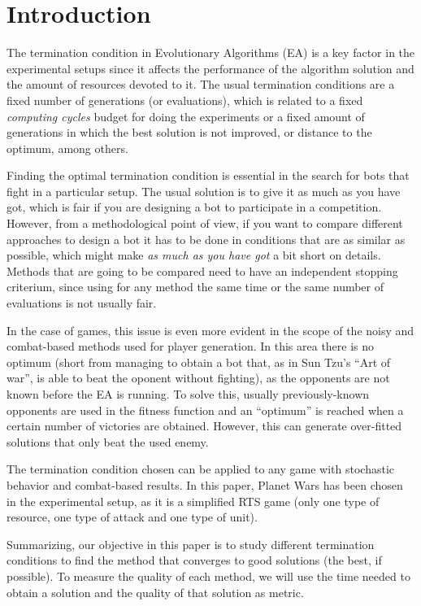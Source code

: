 \documentclass[runningheads,a4paper]{llncs}
\begin{document}
\section{Introduction}

The termination condition in Evolutionary Algorithms (EA) is a key
factor in the experimental setups since it affects the performance of
the algorithm solution and the amount of resources devoted to it. The
usual termination conditions are a fixed number of generations (or
evaluations), which is related to a fixed {\em computing cycles}
budget for doing the experiments or a fixed amount of generations in
which the best solution is not improved, or distance to the optimum,
among others.

Finding the optimal termination condition is essential in the search for
bots that fight in a particular setup. The usual solution is to give
it as much as you have got, which is fair if you are designing a bot %
to participate in a competition. However, from a methodological point
of view, if you want to compare different approaches to design a bot
it has to be done in conditions that are as similar as possible, which
might make {\em as much as you have got} a bit short on
details. Methods that are going to be compared need to have an
independent stopping criterium, since using for any method the same
time or the same number of evaluations is not usually fair. 
 
In the case of games, this issue is even more evident in the scope of
the noisy and combat-based methods used for player generation. In this
area there is no optimum (short from managing to obtain a bot that, as
in Sun Tzu's ``Art of war'', is able to beat the oponent without
fighting), as the opponents are not known before the EA is running. To
solve this, usually previously-known opponents are used in the fitness
function and an ``optimum'' is reached when a certain number of
victories are obtained. However, this can generate over-fitted
solutions that only beat the used enemy. %

The termination condition chosen can be applied to any game with
stochastic behavior and combat-based results. In this paper, Planet
Wars has been chosen in the experimental setup, as it is a simplified
RTS game (only one type of resource, one type of attack and one type
of unit).

Summarizing, our objective in this paper is to study different 
termination conditions to find the method that converges to good 
solutions (the best, if possible). To measure the quality of each 
method, we will use the time needed to obtain a solution and the quality of that solution as metric.
\end{document}
